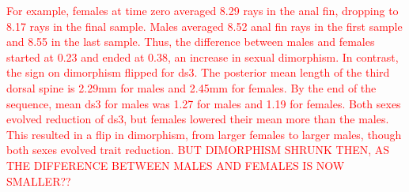 \documentclass[
  12pt,
]{article}
\begin{document}
\textcolor{red} {
For example, females at time zero averaged 8.29 rays in the anal fin, dropping to 8.17 rays in the final sample. Males averaged 8.52 anal fin rays in the first sample and 8.55 in the last sample. Thus, the difference between males and females started at 0.23 and ended at 0.38, an increase in sexual dimorphism. In contrast, the sign on dimorphism flipped for ds3. The posterior mean length of the third dorsal spine is 2.29mm for males and 2.45mm for females. By the end of the sequence, mean ds3 for males was 1.27 for males and 1.19 for females. Both sexes evolved reduction of ds3, but females lowered their mean more than the males. This resulted in a flip in dimorphism, from larger females to larger males, though both sexes evolved trait reduction. BUT DIMORPHISM SHRUNK THEN, AS THE DIFFERENCE BETWEEN MALES AND FEMALES IS NOW SMALLER??
}
\end{document}
